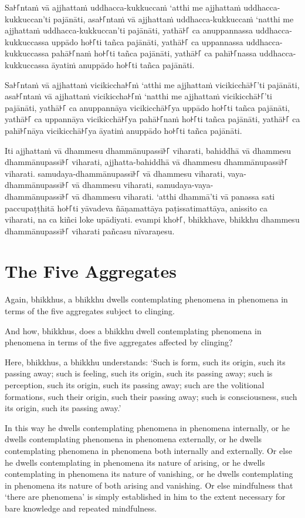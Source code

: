 \paliPage

Sa꜔꜒ntaṁ vā ajjhattaṁ uddhacca-kukkuccaṁ ‘atthi me ajjhattaṁ uddhacca-kukkuccan’ti pajānāti,
asa꜔꜒ntaṁ vā ajjhattaṁ uddhacca-kukkuccaṁ ‘natthi me ajjhattaṁ uddhacca-kukkuccan’ti pajānāti,
yathā꜔꜒ ca anuppannassa uddhacca-kukkuccassa uppādo ho꜔꜒ti tañca pajānāti,
yathā꜔꜒ ca uppannassa uddhacca-kukkuccassa pahā꜔꜒naṁ ho꜔꜒ti tañca pajānāti,
yathā꜔꜒ ca pahī꜔꜒nassa uddhacca-kukkuccassa āyatiṁ anuppādo ho꜔꜒ti tañca pajānāti.

Sa꜔꜒ntaṁ vā ajjhattaṁ vicikiccha꜔꜒ṁ ‘atthi me ajjhattaṁ vicikicchā꜔꜒’ti pajānāti,
asa꜔꜒ntaṁ vā ajjhattaṁ vicikiccha꜔꜒ṁ ‘natthi me ajjhattaṁ vicikicchā꜔꜒’ti pajānāti,
yathā꜔꜒ ca anuppannāya vicikicchā꜔꜒ya uppādo ho꜔꜒ti tañca pajānāti,
yathā꜔꜒ ca uppannāya vicikicchā꜔꜒ya pahā꜔꜒naṁ ho꜔꜒ti tañca pajānāti,
yathā꜔꜒ ca pahī꜔꜒nāya vicikicchā꜔꜒ya āyatiṁ anuppādo ho꜔꜒ti tañca pajānāti.

Iti ajjhattaṁ vā dhammesu dhammānupassī꜔꜒ viharati,
bahiddhā vā dhammesu dhammānupassī꜔꜒ viharati,
ajjhatta-bahiddhā vā dhammesu dhammānupassī꜔꜒ viharati.
samudaya-dhammānupassī꜔꜒ vā dhammesu viharati,
vaya-dhammānupassī꜔꜒ vā dhammesu viharati,
samudaya-vaya-\\ dhammānupassī꜔꜒ vā dhammesu viharati.
‘atthi dhammā’ti vā panassa sati paccupaṭṭhitā ho꜔꜒ti
yāvadeva ñāṇamattāya paṭissatimattāya, anissito ca viharati,
na ca kiñci loke upādiyati. evampi kho꜔꜒, bhikkhave, bhikkhu
dhammesu dhammānupassī꜔꜒ viharati pañcasu nīvaraṇesu.


\englishPage
\section{The Five Aggregates}

Again, bhikkhus, a bhikkhu dwells contemplating phenomena in phenomena in terms
of the five aggregates subject to clinging.

And how, bhikkhus, does a bhikkhu dwell contemplating phenomena in phenomena in
terms of the five aggregates affected by clinging?

Here, bhikkhus, a bhikkhu understands:
`Such is form, such its origin, such its passing away;
such is feeling, such its origin, such its passing away;
such is perception, such its origin, such its passing away;
such are the volitional formations, such their origin, such their passing away;
such is consciousness, such its origin, such its passing away.'

In this way he dwells contemplating phenomena in phenomena internally, or he
dwells contemplating phenomena in phenomena externally, or he dwells
contemplating phenomena in phenomena both internally and externally. Or else he
dwells contemplating in phenomena its nature of arising, or he dwells
contemplating in phenomena its nature of vanishing, or he dwells contemplating
in phenomena its nature of both arising and vanishing. Or else mindfulness that
‘there are phenomena’ is simply established in him to the extent necessary for
bare knowledge and repeated mindfulness.


